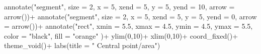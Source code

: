 \documentclass[
  letterpaper,
  DIV=11,
  numbers=noendperiod]{scrreprt}
\newenvironment{Shaded}{\begin{snugshade}}{\end{snugshade}}
\newcommand{\AttributeTok}[1]{\textcolor[rgb]{0.40,0.45,0.13}{#1}}
\newcommand{\DecValTok}[1]{\textcolor[rgb]{0.68,0.00,0.00}{#1}}
\newcommand{\FloatTok}[1]{\textcolor[rgb]{0.68,0.00,0.00}{#1}}
\newcommand{\FunctionTok}[1]{\textcolor[rgb]{0.28,0.35,0.67}{#1}}
\newcommand{\NormalTok}[1]{\textcolor[rgb]{0.00,0.23,0.31}{#1}}
\newcommand{\SpecialCharTok}[1]{\textcolor[rgb]{0.37,0.37,0.37}{#1}}
\newcommand{\StringTok}[1]{\textcolor[rgb]{0.13,0.47,0.30}{#1}}
\begin{document}
\begin{Shaded}
\begin{Highlighting}[]
  \FunctionTok{annotate}\NormalTok{(}\StringTok{"segment"}\NormalTok{, }\AttributeTok{size =} \DecValTok{2}\NormalTok{, }\AttributeTok{x =} \DecValTok{5}\NormalTok{, }\AttributeTok{xend =} \DecValTok{5}\NormalTok{, }\AttributeTok{y =} \DecValTok{5}\NormalTok{, }\AttributeTok{yend =} \DecValTok{10}\NormalTok{, }\AttributeTok{arrow =} \FunctionTok{arrow}\NormalTok{())}\SpecialCharTok{+}
  \FunctionTok{annotate}\NormalTok{(}\StringTok{"segment"}\NormalTok{, }\AttributeTok{size =} \DecValTok{2}\NormalTok{, }\AttributeTok{x =} \DecValTok{5}\NormalTok{, }\AttributeTok{xend =} \DecValTok{5}\NormalTok{, }\AttributeTok{y =} \DecValTok{5}\NormalTok{, }\AttributeTok{yend =} \DecValTok{0}\NormalTok{, }\AttributeTok{arrow =} \FunctionTok{arrow}\NormalTok{())}\SpecialCharTok{+}
   \FunctionTok{annotate}\NormalTok{(}\StringTok{"rect"}\NormalTok{, }\AttributeTok{xmin =} \FloatTok{5.5}\NormalTok{, }\AttributeTok{xmax =} \FloatTok{4.5}\NormalTok{, }\AttributeTok{ymin =} \FloatTok{4.5}\NormalTok{, }\AttributeTok{ymax =} \FloatTok{5.5}\NormalTok{, }\AttributeTok{color =} \StringTok{"black"}\NormalTok{, }\AttributeTok{fill =} \StringTok{"orange"}\NormalTok{ )}\SpecialCharTok{+}
  \FunctionTok{ylim}\NormalTok{(}\DecValTok{0}\NormalTok{,}\DecValTok{10}\NormalTok{)}\SpecialCharTok{+}
  \FunctionTok{xlim}\NormalTok{(}\DecValTok{0}\NormalTok{,}\DecValTok{10}\NormalTok{)}\SpecialCharTok{+}
  \FunctionTok{coord\_fixed}\NormalTok{()}\SpecialCharTok{+}
  \FunctionTok{theme\_void}\NormalTok{()}\SpecialCharTok{+}
  \FunctionTok{labs}\NormalTok{(}\AttributeTok{title =} \StringTok{"    Central point/area"}\NormalTok{)}


\end{Highlighting}
\end{Shaded}
\end{document}

